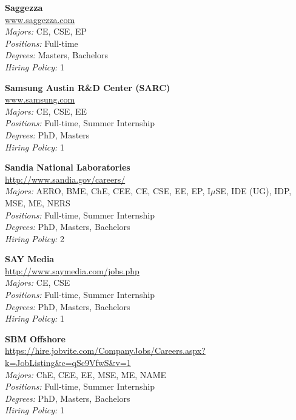 \documentclass[twoside]{article}
\begin{document}
\begin{center}
\begin{multicols}{3}
\begin{minipage}{.9\columnwidth}{\Large\bf Saggezza }\\
	\url{www.saggezza.com}\\
	\emph{Majors:} CE, CSE, EP\\
	\emph{Positions:} Full-time\\
	\emph{Degrees:} Masters, Bachelors\\
	\emph{Hiring Policy:} 1\\
\end{minipage}
 
\begin{minipage}{.9\columnwidth}{\Large\bf Samsung Austin R\&D Center (SARC) }\\
	\url{www.samsung.com}\\
	\emph{Majors:} CE, CSE, EE\\
	\emph{Positions:} Full-time, Summer Internship\\
	\emph{Degrees:} PhD, Masters\\
	\emph{Hiring Policy:} 1\\
\end{minipage}
 
\begin{minipage}{.9\columnwidth}{\Large\bf Sandia National Laboratories }\\
	\url{http://www.sandia.gov/careers/}\\
	\emph{Majors:} AERO, BME, ChE, CEE, CE, CSE, EE, EP, I$\mu$SE, IDE (UG), IDP, MSE, ME, NERS\\
	\emph{Positions:} Full-time, Summer Internship\\
	\emph{Degrees:} PhD, Masters, Bachelors\\
	\emph{Hiring Policy:} 2\\
\end{minipage}
 
\begin{minipage}{.9\columnwidth}{\Large\bf SAY Media }\\
	\url{http://www.saymedia.com/jobs.php}\\
	\emph{Majors:} CE, CSE\\
	\emph{Positions:} Full-time, Summer Internship\\
	\emph{Degrees:} PhD, Masters, Bachelors\\
	\emph{Hiring Policy:} 1\\
\end{minipage}
 
\begin{minipage}{.9\columnwidth}{\Large\bf SBM Offshore }\\
	\url{https://hire.jobvite.com/CompanyJobs/Careers.aspx?k=JobListing&c=qSc9VfwS&v=1}\\
	\emph{Majors:} ChE, CEE, EE, MSE, ME, NAME\\
	\emph{Positions:} Full-time, Summer Internship\\
	\emph{Degrees:} PhD, Masters, Bachelors\\
	\emph{Hiring Policy:} 1\\
\end{minipage}
 

\end{multicols}
\end{center}
\end{document}
